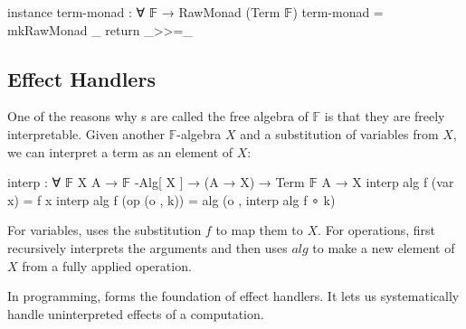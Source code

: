 \begin{code}[hide]
instance
  term-monad : ∀ {𝔽} → RawMonad (Term 𝔽)
  term-monad = mkRawMonad _ return _>>=_
\end{code}

\subsection{Effect Handlers}

One of the reasons why s are called the free algebra of $\mathbb{F}$ is that they are freely interpretable.
%
Given another $\mathbb{F}$-algebra $X$ and a substitution of variables from $X$, we can interpret a term as an element of $X$:
%
\begin{center}\begin{code}
interp : ∀ {𝔽} {X A} → 𝔽 -Alg[ X ] → (A → X) → Term 𝔽 A → X
interp alg f (var x)       = f x
interp alg f (op (o , k))  = alg (o , interp alg f ∘ k)
\end{code}\end{center}
%
For variables,  uses the substitution $f$ to map them to $X$.
%
For operations,  first recursively interprets the arguments and then uses ${alg}$ to make a new element of $X$ from a fully applied operation.

In programming,  forms the foundation of effect handlers.
%
It lets us systematically handle uninterpreted effects of a computation.
